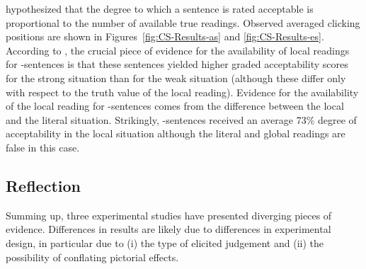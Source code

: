 \documentclass[fleqn,reqno,10pt,draft]{article}
\newcommand{\as}{\acro{as}}
\renewcommand{\es}{\acro{es}}
\begin{document}

\citeauthor{ChemlaSpector2010:Experimental-Ev} hypothesized that the
degree to which a sentence is rated acceptable is proportional to the
number of available true readings. Observed averaged clicking
positions are shown in Figures~\ref{fig:CS-Results-as} and
\ref{fig:CS-Results-es}.
%
%
According to \citeauthor{ChemlaSpector2010:Experimental-Ev}, the
crucial piece of evidence for the availability of local readings for
\as-sentences is that these sentences yielded higher graded
acceptability scores for the strong situation than for the weak
situation (although these differ only with respect to the truth value
of the local reading). Evidence for the availability
of the local reading for \es-sentences comes from the difference
between the local and the literal situation. Strikingly, \es-sentences
received an average 73\% degree of acceptability in the local
situation although the literal and global readings are false in this
case.

\subsection{Reflection}
\label{sec:local-read-categ}

Summing up, three experimental studies have presented diverging pieces
of evidence. %
Differences in results are likely due to differences in experimental
design, in particular due to (i) the type of elicited judgement and
(ii) the possibility of conflating pictorial effects.
\end{document}
